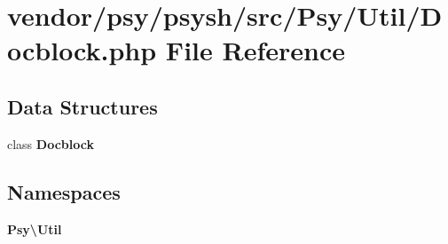 \section{vendor/psy/psysh/src/\+Psy/\+Util/\+Docblock.php File Reference}
\label{psy_2psysh_2src_2_psy_2_util_2_doc_block_8php}
\subsection*{Data Structures}
\begin{DoxyCompactItemize}
\item 
class {\bf Docblock}
\end{DoxyCompactItemize}
\subsection*{Namespaces}
\begin{DoxyCompactItemize}
\item 
 {\bf Psy\textbackslash{}\+Util}
\end{DoxyCompactItemize}
